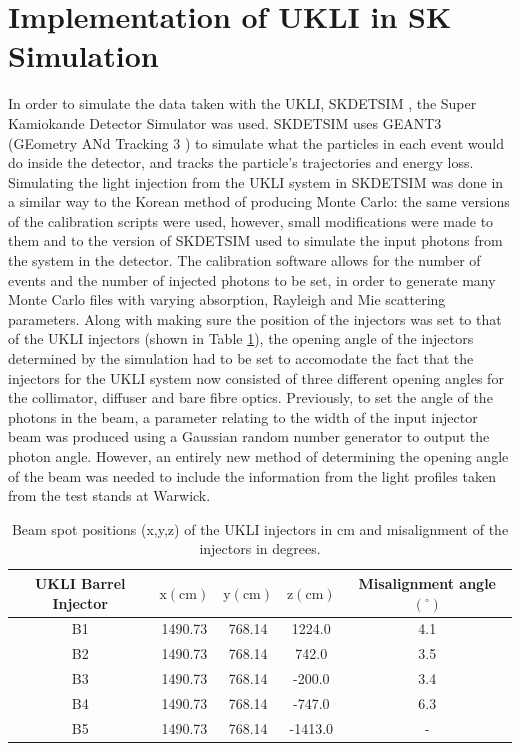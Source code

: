 \section{Implementation of UKLI in SK Simulation}
In order to simulate the data taken with the UKLI, SKDETSIM \cite{harada2019development}, the Super Kamiokande Detector Simulator was used. SKDETSIM uses GEANT3 (GEometry ANd Tracking 3 \cite{geant3_cite}) to simulate what the particles in each event would do inside the detector, and tracks the particle's trajectories and energy loss. Simulating the light injection from the UKLI system in SKDETSIM was done in a similar way to the Korean method of producing Monte Carlo: the same versions of the calibration scripts were used, however, small modifications were made to them and to the version of SKDETSIM used to simulate the input photons from the system in the detector. The calibration software allows for the number of events and the number of injected photons to be set, in order to generate many Monte Carlo files with varying absorption, Rayleigh and Mie scattering parameters. 
\newline
Along with making sure the position of the injectors was set to that of the UKLI injectors (shown in Table \ref{table:UKLI_loc}), the opening angle of the injectors determined by the simulation had to be set to accomodate the fact that the injectors for the UKLI system now consisted of three different opening angles for the collimator, diffuser and bare fibre optics. Previously, to set the angle of the photons in the beam, a parameter relating to the width of the input injector beam was produced using a Gaussian random number generator to output the photon angle. However, an entirely new method of determining the opening angle of the beam was needed to include the information from the light profiles taken from the test stands at Warwick. 

\begin{table}
\centering
\begin{tabular}{||c|c|c|c|c||}
    \hline UKLI Barrel Injector & $\mathrm{x}(\mathrm{cm})$ & $\mathrm{y}(\mathrm{cm})$ & $\mathrm{z}(\mathrm{cm})$ & Misalignment angle $\left({ }^{\circ}\right)$ \\
    \hline B1 & 1490.73 & 768.14 & 1224.0 & 4.1 \\
    \hline B2 & 1490.73 & 768.14 & 742.0 & 3.5 \\
    \hline B3 & 1490.73 & 768.14 & -200.0 & 3.4 \\
    \hline B4 & 1490.73 & 768.14 & -747.0 & 6.3 \\
    \hline B5 & 1490.73 & 768.14 & -1413.0 & - \\
    \hline 
\end{tabular}
\caption{Beam spot positions (x,y,z) of the UKLI injectors in cm and misalignment of the injectors in degrees.} 
\label{table:UKLI_loc}
\end{table}

